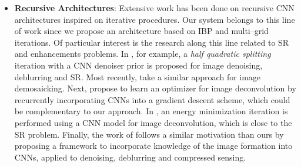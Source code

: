 \documentclass[letterpaper]{article}
\begin{document}
\begin{itemize}
    \item \textbf{Recursive Architectures}: Extensive work has been done on recursive CNN architectures inspired on iterative procedures. Our system belongs to this line of work since we propose an architecture based on IBP and multi--grid iterations. Of particular interest is the research along this line related to SR and enhancements problems. In \cite{Kruse_2017_ICCV}, for example, a \emph{half quadratic splitting} iteration with a CNN denoiser prior is proposed for image denoising, deblurring and SR. Most recently, \cite{DBLP:journals/corr/abs-1803-05215} take a similar approach for image demosaicking. Next, \cite{DBLP:journals/corr/abs-1804-03368} propose to learn an optimizer for image deconvolution by recurrently incorporating CNNs into a gradient descent scheme, which could be complementary to our approach. In \cite{Zhang_2017_CVPR}, an energy minimization iteration is performed using a CNN model for image deconvolution, which is close to the SR problem. Finally, the work of \cite{DBLP:journals/corr/DiamondSHW17} follows a similar motivation than ours by proposing a framework to incorporate knowledge of the image formation into CNNs, applied to denoising, deblurring and compressed sensing.


\end{itemize}
\end{document}
